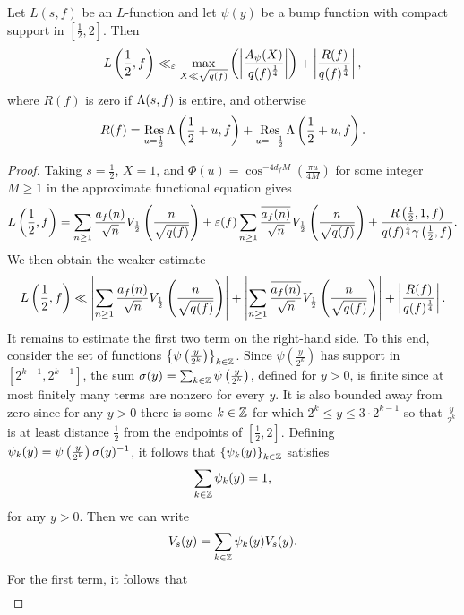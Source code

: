     \begin{theorem}
      Let $L(s,f)$ be an $L$-function and let $\psi(y)$ be a bump function with compact support in $\left[\frac{1}{2},2\right]$. Then
      \[
        L\left(\frac{1}{2},f\right) \ll_{\varepsilon} \max_{X \ll \sqrt{q(f)}}\left(\left|\frac{A_{\psi}(X)}{q(f)^{\frac{1}{4}}}\right|\right)+\left|\frac{R(f)}{q(f)^{\frac{1}{4}}}\right|,
      \]
      where $R(f)$ is zero if $\Lambda(s,f)$ is entire, and otherwise
      \[
        R(f) = \operatorname*{\mathrm{Res}}_{u = \frac{1}{2}}\Lambda\left(\frac{1}{2}+u,f\right)+\operatorname*{\mathrm{Res}}_{u = -\frac{1}{2}}\Lambda\left(\frac{1}{2}+u,f\right).
      \]
    \end{theorem}
    \begin{proof}
      Taking $s = \frac{1}{2}$, $X = 1$, and $\Phi(u) = \cos^{-4d_{f}M}\left(\frac{\pi u}{4M}\right)$ for some integer $M \ge 1$ in the approximate functional equation gives
      \[
        L\left(\frac{1}{2},f\right) = \sum_{n \ge 1}\frac{a_{f}(n)}{\sqrt{n}}V_{\frac{1}{2}}\left(\frac{n}{\sqrt{q(f)}}\right)+\varepsilon(f)\sum_{n \ge 1}\frac{\overline{a_{f}(n)}}{\sqrt{n}}V_{\frac{1}{2}}\left(\frac{n}{\sqrt{q(f)}}\right)+\frac{R\left(\frac{1}{2},1,f\right)}{q(f)^{\frac{1}{4}}\gamma\left(\frac{1}{2},f\right)}.
      \]
      We then obtain the weaker estimate
      \[
        L\left(\frac{1}{2},f\right) \ll \left|\sum_{n \ge 1}\frac{a_{f}(n)}{\sqrt{n}}V_{\frac{1}{2}}\left(\frac{n}{\sqrt{q(f)}}\right)\right|+\left|\sum_{n \ge 1}\frac{\overline{a_{f}(n)}}{\sqrt{n}}V_{\frac{1}{2}}\left(\frac{n}{\sqrt{q(f)}}\right)\right|+\left|\frac{R(f)}{q(f)^{\frac{1}{4}}}\right|.
      \]
      It remains to estimate the first two term on the right-hand side. To this end, consider the set of functions $\left\{\psi\left(\frac{y}{2^{k}}\right)\right\}_{k \in \mathbb{Z}}$. Since $\psi\left(\frac{y}{2^{k}}\right)$ has support in $[2^{k-1},2^{k+1}]$, the sum $\sigma(y) = \sum_{k \in \mathbb{Z}}\psi\left(\frac{y}{2^{k}}\right)$, defined for $y > 0$, is finite since at most finitely many terms are nonzero for every $y$. It is also bounded away from zero since for any $y > 0$ there is some $k \in \mathbb{Z}$ for which $2^{k} \le y \le 3 \cdot 2^{k-1}$ so that $\frac{y}{2^{k}}$ is at least distance $\frac{1}{2}$ from the endpoints of $\left[\frac{1}{2},2\right]$. Defining $\psi_{k}(y) = \psi\left(\frac{y}{2^{k}}\right)\sigma(y)^{-1}$, it follows that $\left\{\psi_{k}(y)\right\}_{k \in \mathbb{Z}}$ satisfies
      \[
        \sum_{k \in \mathbb{Z}}\psi_{k}(y) = 1,
      \]
      for any $y > 0$. Then we can write
      \[
        V_{s}(y) = \sum_{k \in \mathbb{Z}}\psi_{k}(y)V_{s}(y).
      \]
      For the first term, it follows that
      \begin{align*}

\end{align*}
\end{proof}
